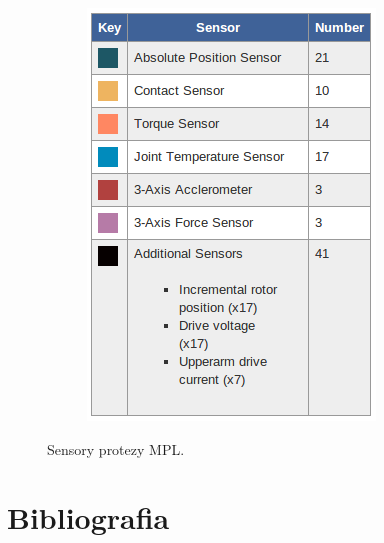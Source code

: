 \documentclass[8pt]{beamer}
\begin{document}
\begin{frame}
\begin{figure}
\begin{center}
\begin{subfigure}[b]{0.4\textwidth}
                		\includegraphics[width=\textwidth]{graphics/mpl_opis.png}
                		\label{graph:g6}
        			\end{subfigure}%
				\end{center}
				\caption{Sensory protezy MPL.}
			\end{figure}
		\end{frame}				
%
	
		
	

\section*{Bibliografia}

\begin{frame}[allowframebreaks]
	
\end{frame}
\end{document}
